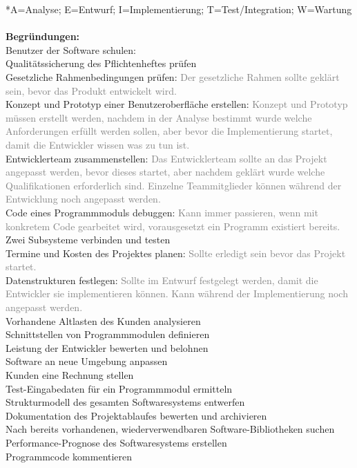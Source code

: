 \documentclass[a4paper,11pt]{scrartcl}
\begin{document}
	*A=Analyse; E=Entwurf; I=Implementierung; T=Test/Integration; W=Wartung\\
	\\\textbf{Begründungen:}\\
	Benutzer der Software schulen: \textcolor{gray}{}\\
	Qualitätssicherung des Pflichtenheftes prüfen\\
	Gesetzliche Rahmenbedingungen prüfen: \textcolor{gray}{Der gesetzliche Rahmen sollte geklärt sein, bevor das Produkt entwickelt wird.}\\
	Konzept und Prototyp einer Benutzeroberfläche erstellen: \textcolor{gray}{Konzept und Prototyp müssen erstellt werden, nachdem in der Analyse bestimmt wurde welche Anforderungen erfüllt werden sollen, aber bevor die Implementierung startet, damit die Entwickler wissen was zu tun ist.} \\
	Entwicklerteam zusammenstellen: \textcolor{gray}{Das Entwicklerteam sollte an das Projekt angepasst werden, bevor dieses startet, aber nachdem geklärt wurde welche Qualifikationen erforderlich sind. Einzelne Teammitglieder können während der Entwicklung noch angepasst werden.}\\
	Code eines Programmmoduls debuggen: \textcolor{gray}{Kann immer passieren, wenn mit konkretem Code gearbeitet wird, vorausgesetzt ein Programm existiert bereits.}\\			
 	Zwei Subsysteme verbinden und testen\\			
 	Termine und Kosten des Projektes planen: \textcolor{gray}{Sollte erledigt sein bevor das Projekt startet.}\\		
	Datenstrukturen festlegen: \textcolor{gray}{Sollte im Entwurf festgelegt werden, damit die Entwickler sie implementieren können. Kann während der Implementierung noch angepasst werden.}\\				
	Vorhandene Altlasten des Kunden analysieren\\			
	Schnittstellen von Programmmodulen definieren\\			
	Leistung der Entwickler bewerten und belohnen\\			
	Software an neue Umgebung anpassen\\		
	Kunden eine Rechnung stellen\\				
	Test-Eingabedaten für ein Programmmodul ermitteln\\	
	Strukturmodell des gesamten Softwaresystems entwerfen\\
	Dokumentation des Projektablaufes bewerten und archivieren\\	
	Nach bereits vorhandenen, wiederverwendbaren Software-Bibliotheken suchen\\
	Performance-Prognose des Softwaresystems erstellen\\
	Programmcode kommentieren\\	
	
\end{document}
